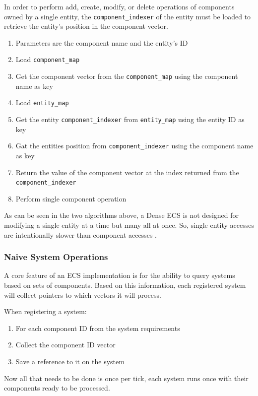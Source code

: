 In order to perform add, create, modify, or delete operations of components owned by a single entity, the \texttt{component\_indexer} of the entity must be loaded to retrieve the entity's position in the component vector.

\begin{enumerate}
    \item Parameters are the component name and the entity's ID
    \item Load \texttt{component\_map}
    \item Get the component vector from the \texttt{component\_map} using the component name as key
    \item Load \texttt{entity\_map}
    \item Get the entity \texttt{component\_indexer} from \texttt{entity\_map} using the entity ID as key
    \item Gat the entities position from \texttt{component\_indexer} using the component name as key
    \item Return the value of the component vector at the index returned from the \texttt{component\_indexer}
    \item Perform single component operation
\end{enumerate}

As can be seen in the two algorithms above, a Dense ECS is not designed for modifying a single entity at a time but many all at once. So, single entity accesses are intentionally slower than component accesses \cite{EnTT_SparseSets}.

\subsubsection{Naive System Operations}
A core feature of an ECS implementation is for the ability to query systems based on sets of components. Based on this information, each registered system will collect pointers to which vectors it will process.

When registering a system:
\begin{enumerate}
    \item For each component ID from the system requirements
    \item Collect the component ID vector
    \item Save a reference to it on the system
\end{enumerate}

Now all that needs to be done is once per tick, each system runs once with their components ready to be processed.

